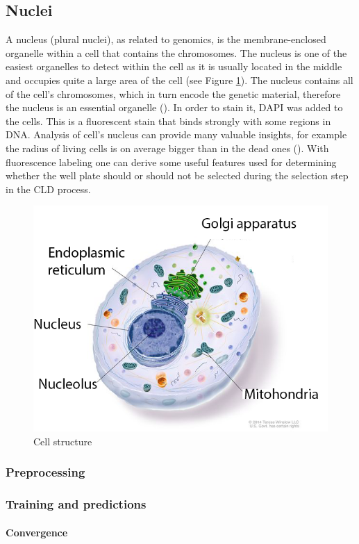 \subsection{Nuclei}
    A nucleus (plural nuclei), as related to genomics, is the membrane-enclosed organelle within a cell that contains the chromosomes. The nucleus is one of the easiest organelles to detect within the cell as it is usually located in the middle and occupies quite a large area of the cell (see Figure \ref{fig:cell}). The nucleus contains all of the cell's chromosomes, which in turn encode the genetic material, therefore the nucleus is an essential organelle (\cite{genomegov}). In order to stain it, DAPI was added to the cells. This is a fluorescent stain that binds strongly with some regions in DNA. Analysis of cell's nucleus can provide many valuable insights, for example the radius of living cells is on average bigger than in the dead ones (\cite{Christiansen_2018}). With fluorescence labeling one can derive some useful features used for determining whether the well plate should or should not be selected during the selection step in the CLD process.
    \begin{figure}[htb]
        \begin{center}
            \includegraphics[width=0.4\linewidth]{bilder/cell structure.png}
            \caption{Cell structure \cite{cell}}\label{fig:cell}
        \end{center}
    \end{figure}
    \subsubsection{Preprocessing}\label{section:nuclei-preprocessing}
        
    \subsubsection{Training and predictions}
        \paragraph{Convergence}
              
